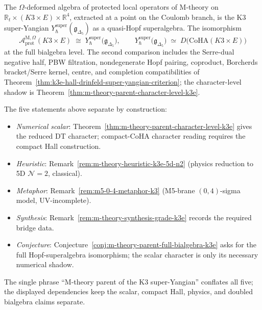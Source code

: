\begin{conjecture}
\label{conj:m-theory-parent-full-bialgebra-k3e}
The $\Omega$-deformed algebra of protected local operators of M-theory on $\mathbb{R}_t \times (K3 \times E) \times \mathbb{R}^4$, extracted at a point on the Coulomb branch, is the K3 super-Yangian $Y_{\hbar}^{\mathrm{super}}(\mathfrak{g}_{\Delta_5})$ as a quasi-Hopf superalgebra. The isomorphism
\[
 \mathcal{A}^{\mathrm{M}, \Omega}_{\mathrm{prot}}(K3 \times E) \;\cong\; Y_\hbar^{\mathrm{super}}\bigl(\mathfrak{g}_{\Delta_5}\bigr),
 \qquad
 Y_\hbar^{\mathrm{super}}\bigl(\mathfrak{g}_{\Delta_5}\bigr) \;\simeq\; D\bigl(\mathrm{CoHA}(K3 \times E)\bigr)
\]
at the full bialgebra level. The second comparison includes the
Serre-dual negative half, PBW filtration, nondegenerate Hopf pairing,
coproduct, Borcherds bracket/Serre kernel, centre, and completion
compatibilities
of Theorem~\ref{thm:k3e-hall-drinfeld-super-yangian-criterion}; the
character-level shadow is Theorem~\ref{thm:m-theory-parent-character-level-k3e}.
\end{conjecture}

\begin{remark}
\label{rem:k3e-stratification-summary}
The five statements above separate by construction:
\begin{itemize}
\item \emph{Numerical scalar}: Theorem~\ref{thm:m-theory-parent-character-level-k3e} gives the reduced DT character; compact-CoHA character reading requires the compact Hall construction.
\item \emph{Heuristic}: Remark~\ref{rem:m-theory-heuristic-k3e-5d-n2} (physics reduction to 5D $\mathcal{N} = 2$, classical).
\item \emph{Metaphor}: Remark~\ref{rem:m5-0-4-metaphor-k3} (M5-brane $(0, 4)$-sigma model, UV-incomplete).
\item \emph{Synthesis}: Remark~\ref{rem:m-theory-synthesis-grade-k3e} records the required bridge data.
\item \emph{Conjecture}: Conjecture~\ref{conj:m-theory-parent-full-bialgebra-k3e} asks for the full Hopf-superalgebra isomorphism; the scalar character is only its necessary numerical shadow.
\end{itemize}
The single phrase ``M-theory parent of the K3 super-Yangian'' conflates all five; the displayed dependencies keep the scalar, compact Hall, physics, and doubled bialgebra claims separate.
\end{remark}
